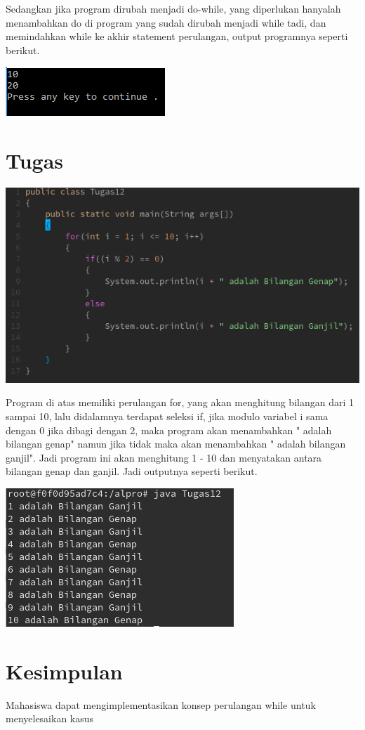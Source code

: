 \documentclass[a4paper,12pt]{article}
\begin{document}
Sedangkan jika program dirubah menjadi do-while, yang diperlukan hanyalah menambahkan do di program yang sudah dirubah menjadi while tadi, dan memindahkan while ke akhir statement perulangan, output programnya seperti berikut.
\begin{center}
    \includegraphics[scale=1]{image10}
\end{center}

\section{Tugas}
\begin{center}
    \includegraphics[scale=.8]{image11}
\end{center}
Program di atas memiliki perulangan for, yang akan menghitung bilangan dari 1 sampai 10, lalu didalamnya terdapat seleksi if, jika modulo variabel i sama dengan 0 jika dibagi dengan 2, maka program akan menambahkan " adalah bilangan genap" namun jika tidak maka akan menambahkan " adalah bilangan ganjil". Jadi program ini akan menghitung 1 - 10 dan menyatakan antara bilangan genap dan ganjil. Jadi outputnya seperti berikut.
\begin{center}
    \includegraphics[scale=1]{image12}
\end{center}

\newpage
\section{Kesimpulan}
Mahasiswa dapat mengimplementasikan konsep perulangan while untuk menyelesaikan kasus
\end{document}
